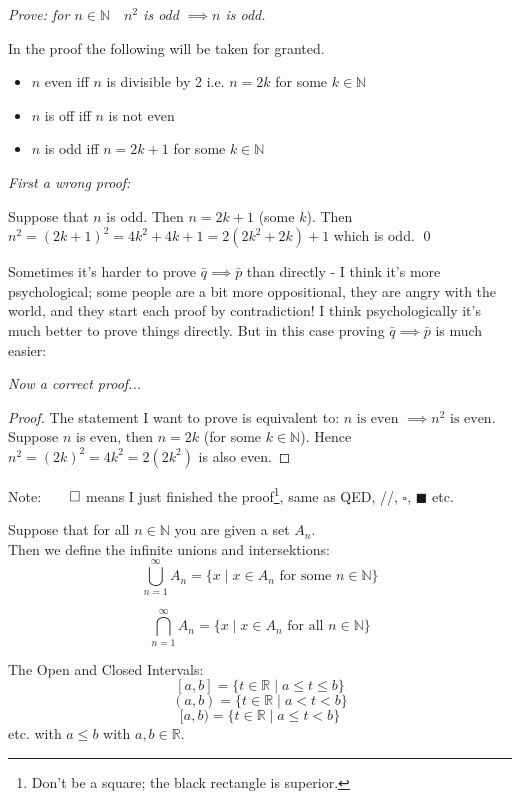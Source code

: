 \documentclass[10pt]{scrartcl}
\begin{document}
\begin{example} \emph{Prove: for $n \in \mathbb{N} \quad n^2$ is odd $\implies n$ is odd.}

In the proof the following will be taken for granted.
\begin{itemize}
\item $n$ even iff $n$ is divisible by 2 i.e. $n = 2k$ for some $k \in \mathbb{N}$
\item $n$ is off iff $n$ is not even
\item $n$ is odd iff $n = 2k+1$ for some $k \in \mathbb{N}$
\end{itemize}\vspace*{10pt}

\emph{First a wrong proof:}

Suppose that $n$ is odd. Then $n = 2k +1$ (some $k$). Then $n^2 = (2k+1)^2 = 4k^2 + 4k+1 = 2(2k^2 + 2k) + 1$ which is odd. \qed

Sometimes it's harder to prove $\bar{q} \implies \bar{p}$ than directly - I think it's more psychological; some people are a bit more oppositional, they are angry with the world, and they start each proof by contradiction! I think psychologically it's much better to prove things directly. But in this case proving $\bar{q} \implies \bar{p}$ is much easier:

\emph{Now a correct proof...}

\begin{proof} The statement I want to prove is equivalent to:
$n \text{ is even } \implies n^2 \text{ is even}$.
Suppose $n$ is even, then $n = 2k$ (for some $k \in \mathbb{N}$). Hence $n^2 = (2k)^2 = 4k^2 = 2(2k^2)$ is also even.
\end{proof}
\end{example}\vspace*{5pt}

Note:$\qed$ means I just finished the proof\footnote{Don't be a square; the black rectangle is superior.}, same as QED, //, $\square$, $\blacksquare$ etc.\\

\begin{definition}
Suppose that for all $n \in \mathbb{N}$ you are given a set $A_n$.\\

Then we define the infinite unions and intersektions:\\
\[\bigcup_{n=1}^{\infty}A_{n} = \{ x \;|\; x \in A_n \text{ for some } n \in \mathbb{N}\}\]

\[\bigcap_{n=1}^{\infty}A_{n} = \{ x \;|\; x \in A_n \text{ for all } n \in \mathbb{N}\}\]

The Open and Closed Intervals:
\[[a,b] = \{t \in \mathbb{R} \;|\; a \leq t \leq b\}\]
\[(a,b) = \{t \in \mathbb{R} \;|\; a < t < b\}\]
\[[a,b) = \{t \in \mathbb{R} \;|\; a \leq t < b\}\]
 etc. with $a \leq b$ with $a,b \in \mathbb{R}$.
\end{definition}
\end{document}
